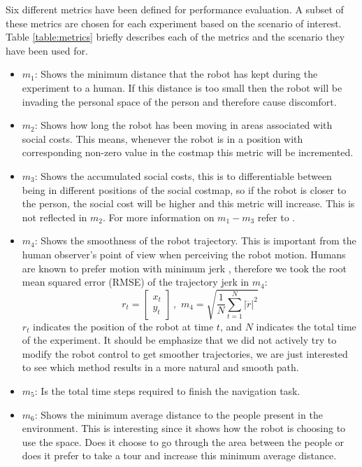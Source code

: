 Six different metrics have been defined for performance evaluation. A subset of these metrics are chosen for each experiment based on the scenario of interest. Table \ref{table:metrics} briefly describes each of the metrics and the scenario they have been used for.



\begin{itemize}

\item $m_{1}$: Shows the minimum distance that the robot has kept during the experiment to a human. If this distance is too small then the robot will be invading the personal space of the person and  therefore cause discomfort. 


\item $m_{2}$: Shows how long the robot has been moving in areas associated with social costs. This means, whenever the robot is in a position with corresponding non-zero value in the costmap this metric will be incremented.

 \item $m_{3}$: Shows the accumulated social costs, this is to differentiable between being in different positions of the social costmap, so if the robot is closer to the person, the social cost will be higher and this metric will increase. This is not reflected in $m_{2}$. For more information on $m_{1}-m_{3}$ refer to \cite{talebpour2015board}. 

\item  $m_{4}$: Shows the smoothness of the robot trajectory. This is important from the human observer's point of view when perceiving the robot motion. Humans are known to prefer motion with minimum jerk \cite{sisbot2010synthesizing}, therefore we took the root mean squared error (RMSE) of the trajectory jerk in $m_{4}$:
\begin{equation}
r_{t} = \begin{bmatrix}
x_{t}\\
y_{t} 

\end{bmatrix} \, , \, \,  m_{4} = \sqrt{\frac{1}{N} \sum_{t=1}^{N}\left | \dddot{r} \right |^{2}  }
\end{equation}
$r_{t}$ indicates the position of the robot at time $t$, and $N$ indicates the total time of the experiment. It should be emphasize that we did not actively try to modify the robot control to get smoother trajectories, we are just interested to see which method results in a more natural and smooth path.  

\item $m_{5}$: Is the total time steps required to finish the navigation task.


\item $m_{6}$: Shows the minimum average distance to the people present in the environment. This is interesting since it shows how the robot is choosing to use the space. Does it choose to go through the area between the people or does it prefer to take a tour and increase this minimum average distance.

\end{itemize}

